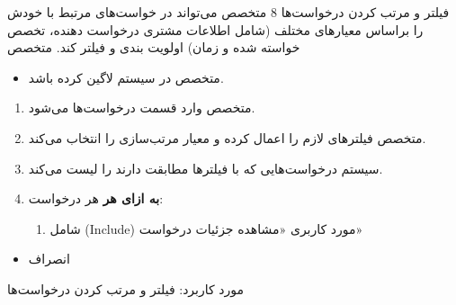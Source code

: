 {
\usecase
{فیلتر و مرتب کردن درخواست‌ها}
{8}
{متخصص می‌تواند در خواست‌های مرتبط با خودش را براساس معیارهای مختلف (شامل اطلاعات مشتری درخواست دهنده، تخصص‌ خواسته شده و زمان) اولویت بندی و فیلتر کند.}
{متخصص}
{}
{	
	\begin{itemize}
		\vspace*{-0.6cm}
		\item 
		متخصص در سیستم لاگین کرده باشد.
	\end{itemize}
}
{
	\vspace*{-0.6cm}
	\begin{enumerate}
		\item 
		متخصص وارد قسمت درخواست‌ها می‌شود.
		\item
		متخصص فیلترهای لازم را اعمال کرده و معیار مرتب‌سازی را انتخاب می‌کند.
		\item
		سیستم درخواست‌هایی که با فیلترها مطابقت دارند را لیست می‌کند.
		
		\item
		\textbf{به ازای هر} هر درخواست:
		
		\begin{enumerate}[label=\theenumi.\arabic*.]
			\item
			شامل (Include) مورد کاربری «مشاهده جزئیات درخواست»
		\end{enumerate}
	
	\end{enumerate}
}
{}
{
	\begin{itemize}
		\item
		انصراف
\end{itemize}
}
{
	مورد کاربرد: فیلتر و مرتب کردن درخواست‌ها
}

}



